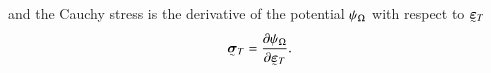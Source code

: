 %
%
%
and the Cauchy stress is the derivative of the potential $\psi_{\Omega{}}$ with respect to $\tensorii{\varepsilon}{}_{\cell}$
%
%
%
\begin{equation}
    \label{eq_stress_ss}
    \begin{aligned}
        \tensorii{\sigma}{}_{\cell} = \frac{\partial \mecPotential_{\bodyLag}}{\partial \tensorii{\varepsilon}{}_{\cell}}.
    \end{aligned}
\end{equation}







